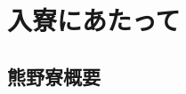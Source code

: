 \documentclass[10pt,b5jsbook,dvips,dvipdfmx,openany]{jsbook}
\theoremstyle{definition}
\begin{document}


\setcounter{page}{1}
  \setcounter{tocdepth}{1}
  \tableofcontents
    \thispagestyle{empty}

  \newpage



\chapter{入寮にあたって}
	\section{熊野寮概要} \label{sec:abst}
\end{document}
